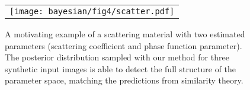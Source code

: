 \begin{figure}[h]
	\centering
	\begin{tabular}{c}
		\texttt{[image: bayesian/fig4/scatter.pdf]}
	\end{tabular}
	\caption[]{\label{fig:bayesian:scatter}
		A motivating example of a scattering material with two estimated parameters (scattering coefficient and phase function parameter). The posterior distribution sampled with our method for three synthetic input images is able to detect the full structure of the parameter space, matching the predictions from similarity theory.
	}
\end{figure}
